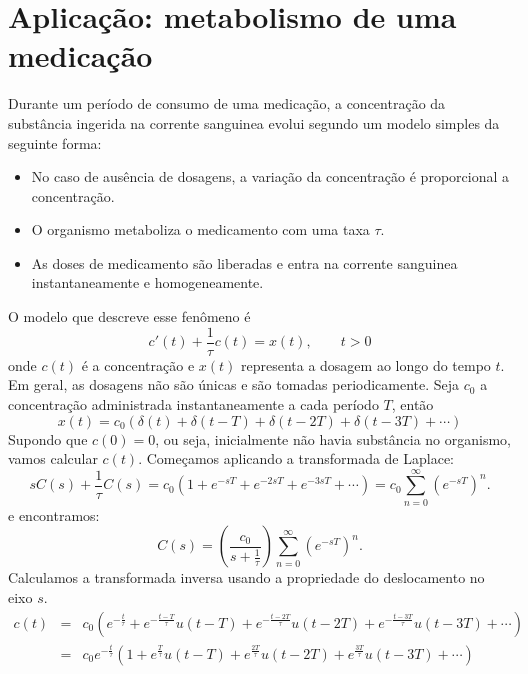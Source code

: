 

\section{Aplicação: metabolismo de uma medicação}
Durante um período de consumo de uma medicação, a concentração da substância ingerida na corrente sanguinea evolui segundo um modelo simples da seguinte forma:
\begin{itemize}
 \item No caso de ausência de dosagens, a variação da concentração é proporcional a concentração.
 \item  O organismo metaboliza o medicamento com uma taxa $\tau$.
  \item As doses de medicamento são liberadas e entra na corrente sanguinea instantaneamente e homogeneamente.
\end{itemize}
O modelo que descreve esse fenômeno é
\begin{equation}
c'(t)+\frac{1}{\tau}c(t)=x(t),\qquad t>0
\end{equation}
onde $c(t)$ é a concentração e $x(t)$ representa a dosagem ao longo do tempo $t$. Em geral, as dosagens não são únicas e são tomadas periodicamente. Seja $c_0$ a concentração administrada instantaneamente a cada período $T$, então
\begin{equation}
x(t)=c_0\left(\delta(t)+\delta(t-T)+\delta(t-2T)+\delta(t-3T)+\cdots\right)
\end{equation}
Supondo que $c(0)=0$, ou seja, inicialmente não havia substância no organismo, vamos calcular $c(t)$. 
Começamos aplicando a transformada de Laplace:
\begin{equation}
sC(s)+\frac{1}{\tau}C(s)=c_0\left(1+e^{-sT}+e^{-2sT}+e^{-3sT}+\cdots\right)=c_0\sum_{n=0}^\infty\left( e^{-sT}\right)^n.
\end{equation}
e encontramos:
\begin{equation}
C(s)=\left(\frac{c_0}{ s+\frac{1}{\tau}}\right)\sum_{n=0}^\infty\left( e^{-sT}\right)^n.
\end{equation}
Calculamos a transformada inversa usando a propriedade do deslocamento no eixo $s$.
\begin{eqnarray*}
c(t)&=&c_0\left(e^{-\frac{t}{\tau}}+e^{-\frac{t-T}{\tau}}u(t-T)+e^{-\frac{t-2T}{\tau}}u(t-2T)+e^{-\frac{t-3T}{\tau}}u(t-3T)+\cdots\right) \\
&=&c_0e^{-\frac{t}{\tau}}\left(1+e^{\frac{T}{\tau}}u(t-T)+e^{\frac{2T}{\tau}}u(t-2T)+e^{\frac{3T}{\tau}}u(t-3T)+\cdots\right)
\end{eqnarray*}
